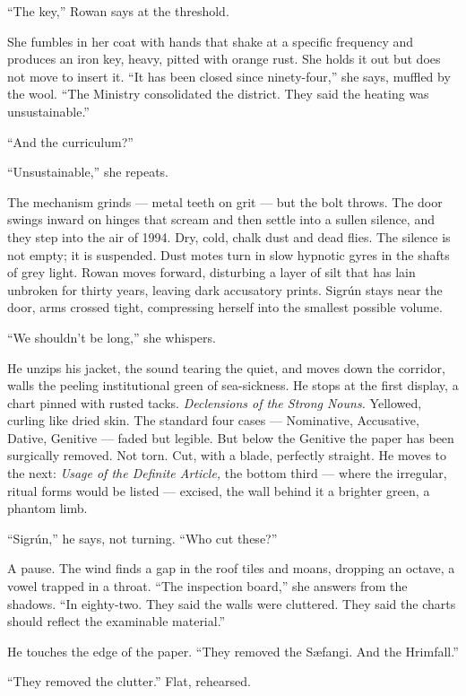 \documentclass[11pt,oneside]{book}
\begin{document}
``The key,'' Rowan says at the threshold.

She fumbles in her coat with hands that shake at a specific frequency
and produces an iron key, heavy, pitted with orange rust. She holds it
out but does not move to insert it. ``It has been closed since
ninety-four,'' she says, muffled by the wool. ``The Ministry
consolidated the district. They said the heating was unsustainable.''

``And the curriculum?''

``Unsustainable,'' she repeats.

The mechanism grinds --- metal teeth on grit --- but the bolt throws.
The door swings inward on hinges that scream and then settle into a
sullen silence, and they step into the air of 1994. Dry, cold, chalk
dust and dead flies. The silence is not empty; it is suspended. Dust
motes turn in slow hypnotic gyres in the shafts of grey light. Rowan
moves forward, disturbing a layer of silt that has lain unbroken for
thirty years, leaving dark accusatory prints. Sigrún stays near the
door, arms crossed tight, compressing herself into the smallest possible
volume.

``We shouldn't be long,'' she whispers.

He unzips his jacket, the sound tearing the quiet, and moves down the
corridor, walls the peeling institutional green of sea-sickness. He
stops at the first display, a chart pinned with rusted tacks.
\emph{Declensions of the Strong Nouns.} Yellowed, curling like dried
skin. The standard four cases --- Nominative, Accusative, Dative,
Genitive --- faded but legible. But below the Genitive the paper has
been surgically removed. Not torn. Cut, with a blade, perfectly
straight. He moves to the next: \emph{Usage of the Definite Article,}
the bottom third --- where the irregular, ritual forms would be listed
--- excised, the wall behind it a brighter green, a phantom limb.

``Sigrún,'' he says, not turning. ``Who cut these?''

A pause. The wind finds a gap in the roof tiles and moans, dropping an
octave, a vowel trapped in a throat. ``The inspection board,'' she
answers from the shadows. ``In eighty-two. They said the walls were
cluttered. They said the charts should reflect the examinable
material.''

He touches the edge of the paper. ``They removed the Sæfangi. And the
Hrimfall.''

``They removed the clutter.'' Flat, rehearsed.
\end{document}
